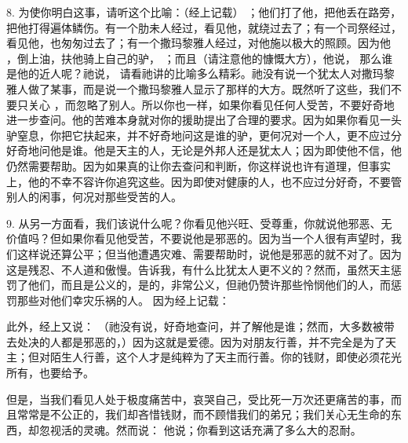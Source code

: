 8. 为使你明白这事，请听这个比喻：（经上记载） ；他们打了他，把他丢在路旁，把他打得遍体鳞伤。有一个肋未人经过，看见他，就绕过去了；有一个司祭经过，看见他，也匆匆过去了；有一个撒玛黎雅人经过，对他施以极大的照顾。因为他 ，倒上油，扶他骑上自己的驴， ；而且（请注意他的慷慨大方），他说，  那么谁是他的近人呢？祂说，  请看祂讲的比喻多么精彩。祂没有说一个犹太人对撒玛黎雅人做了某事，而是说一个撒玛黎雅人显示了那样的大方。既然听了这些，我们不要只关心 ，而忽略了别人。所以你也一样，如果你看见任何人受苦，不要好奇地进一步查问。他的苦难本身就对你的援助提出了合理的要求。因为如果你看见一头驴窒息，你把它扶起来，并不好奇地问这是谁的驴，更何况对一个人，更不应过分好奇地问他是谁。他是天主的人，无论是外邦人还是犹太人；因为即使他不信，他仍然需要帮助。因为如果真的让你去查问和判断，你这样说也许有道理，但事实上，他的不幸不容许你追究这些。因为即使对健康的人，也不应过分好奇，不要管别人的闲事，何况对那些受苦的人。\par

9. 从另一方面看，我们该说什么呢？你看见他兴旺、受尊重，你就说他邪恶、无价值吗？但如果你看见他受苦，不要说他是邪恶的。因为当一个人很有声望时，我们这样说还算公平；但当他遭遇灾难、需要帮助时，说他是邪恶的就不对了。因为这是残忍、不人道和傲慢。告诉我，有什么比犹太人更不义的？然而，虽然天主惩罚了他们，而且是公义的，是的，非常公义，但祂仍赞许那些怜悯他们的人，而惩罚那些对他们幸灾乐祸的人。 因为经上记载：\par

此外，经上又说：  （祂没有说，好奇地查问，并了解他是谁；然而，大多数被带去处决的人都是邪恶的，）因为这就是爱德。因为对朋友行善，并不完全是为了天主；但对陌生人行善，这个人才是纯粹为了天主而行善。你的钱财，即使必须花光所有，也要给予。\par

但是，当我们看见人处于极度痛苦中，哀哭自己，受比死一万次还更痛苦的事，而且常常是不公正的，我们却吝惜钱财，而不顾惜我们的弟兄；我们关心无生命的东西，却忽视活的灵魂。然而说：  他说；你看到这话充满了多么大的忍耐。\par

